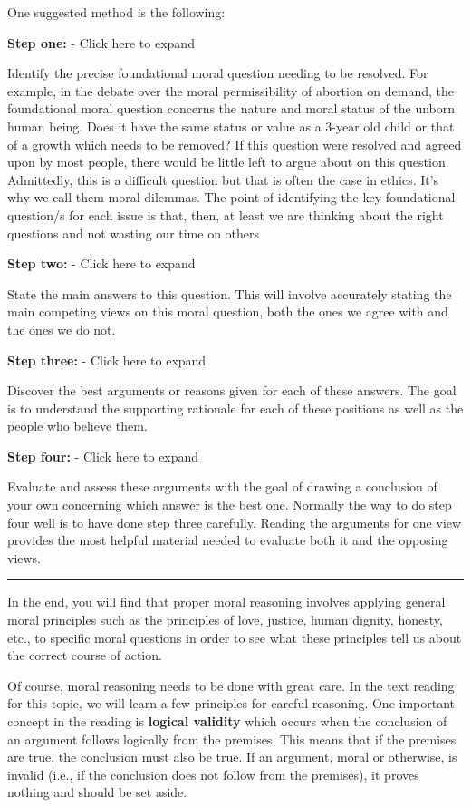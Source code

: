 \documentclass[
]{book}
\begin{document}
One suggested method is the following:

\textbf{Step one:} - Click here to expand

Identify the precise foundational moral question needing to be resolved. For example, in the debate over the moral permissibility of abortion on demand, the foundational moral question concerns the nature and moral status of the unborn human being. Does it have the same status or value as a 3-year old child or that of a growth which needs to be removed? If this question were resolved and agreed upon by most people, there would be little left to argue about on this question. Admittedly, this is a difficult question but that is often the case in ethics. It's why we call them moral dilemmas. The point of identifying the key foundational question/s for each issue is that, then, at least we are thinking about the right questions and not wasting our time on others

\textbf{Step two:} - Click here to expand

State the main answers to this question. This will involve accurately stating the main competing views on this moral question, both the ones we agree with and the ones we do not.

\textbf{Step three:} - Click here to expand

Discover the best arguments or reasons given for each of these answers. The goal is to understand the supporting rationale for each of these positions as well as the people who believe them.

\textbf{Step four:} - Click here to expand

Evaluate and assess these arguments with the goal of drawing a conclusion of your own concerning which answer is the best one. Normally the way to do step four well is to have done step three carefully. Reading the arguments for one view provides the most helpful material needed to evaluate both it and the opposing views.

\begin{center}\rule{0.5\linewidth}{0.5pt}\end{center}

In the end, you will find that proper moral reasoning involves applying general moral principles such as the principles of love, justice, human dignity, honesty, etc., to specific moral questions in order to see what these principles tell us about the correct course of action.

Of course, moral reasoning needs to be done with great care. In the text reading for this topic, we will learn a few principles for careful reasoning. One important concept in the reading is \textbf{logical validity} which occurs when the conclusion of an argument follows logically from the premises. This means that if the premises are true, the conclusion must also be true. If an argument, moral or otherwise, is invalid (i.e., if the conclusion does not follow from the premises), it proves nothing and should be set aside.
\end{document}
